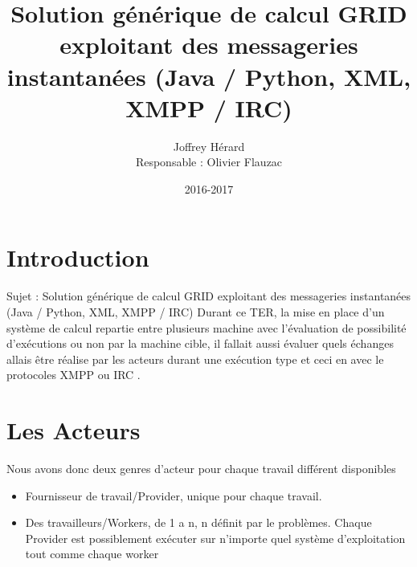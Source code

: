 \documentclass[11pt]{report}
\begin{document}
 \makeatletter
\def\maketitle{%
  \null
  \thispagestyle{empty}%
  \vfill
  \begin{center}\leavevmode
    \normalfont
    {\Huge \@title\par}%
    \vskip 3cm
    {\Large \@author\par}%
    \vskip 1cm
    {\Large \@date\par}%
  \end{center}%
  \vfill
  \null
  \cleardoublepage
  }
\makeatother
\title{Solution générique de calcul GRID exploitant des messageries instantanées
(Java / Python, XML, XMPP / IRC)}
\author{ Joffrey Hérard \begin{center}Responsable : Olivier Flauzac\end{center}}
\date{2016-2017}
\maketitle
 
\tableofcontents 

\newpage
\chapter{Introduction} 
Sujet : Solution générique de calcul GRID exploitant des messageries instantanées
(Java / Python, XML, XMPP / IRC)
Durant ce TER, la mise en place d'un système de calcul repartie entre plusieurs machine avec l’évaluation de possibilité d’exécutions ou non par la machine cible, il fallait aussi évaluer quels échanges allais être réalise par les acteurs durant une exécution type et ceci en avec le protocoles XMPP ou IRC . 
\newpage
\chapter{Les Acteurs} 
Nous avons donc deux genres d'acteur pour chaque travail différent disponibles 
\begin{itemize}
\item Fournisseur de travail/Provider, unique pour chaque travail.
\item Des travailleurs/Workers, de 1 a n, n définit par le problèmes.
Chaque Provider est possiblement exécuter sur n'importe quel système d'exploitation  tout comme chaque worker
\end{itemize}
\newpage
\end{document}
